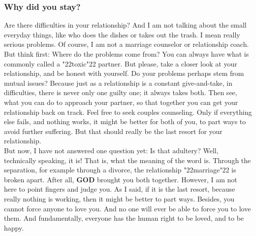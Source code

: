 \documentclass[12pt,a5paper]{article}
\newcommand{\God}[0]{\textbf{GOD}}
\newcommand{\q}[1]{\char"22{#1}\char"22 }
\begin{document}
	\subsubsection{Why did you stay?}
		Are there difficulties in your relationship?
		And I am not talking about the small everyday things,
		like who does the dishes or takes out the trash.
		I mean really serious problems.
		Of course,
		I am not a marriage counselor or relationship coach.
		But think first:
		Where do the problems come from?
		You can always have what is commonly called a \q{toxic} partner.
		But please,
		take a closer look at your relationship,
		and be honest with yourself.
		Do your problems perhaps stem from mutual issues?
		Because just as a relationship is a constant give-and-take,
		in difficulties,
		there is never only one guilty one;
		it always takes both.
		Then see,
		what you can do to approach your partner,
		so that together you can get your relationship back on track.
		Feel free to seek couples counseling.
		Only if everything else fails,
		and nothing works,
		it might be better for both of you,
		to part ways to avoid further suffering.
		But that should really be the last resort for your relationship.
		\\
		But now,
		I have not answered one question yet:
		Is that adultery?
		Well,
		technically speaking,
		it is!
		That is,
		what the meaning of the word is.
		Through the separation,
		for example through a divorce,
		the relationship \q{marriage} is broken apart.
		After all,
		{\God} brought you both together.
		However,
		I am not here to point fingers and judge you.
		As I said,
		if it is the last resort,
		because really nothing is working,
		then it might be better to part ways.
		Besides,
		you cannot force anyone to love you.
		And no one will ever be able to force you to love them.
		And fundamentally,
		everyone has the human right to be loved,
		and to be happy.
\end{document}
